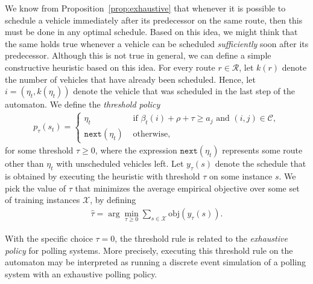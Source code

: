 \documentclass[a4paper]{article}
\theoremstyle{definition}
\theoremstyle{plain}
\begin{document}
We know from Proposition~\ref{prop:exhaustive} that whenever it is possible to schedule a vehicle
immediately after its predecessor on the same route, then this must be done in
any optimal schedule.
%
Based on this idea, we might think that the same holds true whenever a vehicle
can be scheduled \textit{sufficiently} soon after its predecessor. Although this
is not true in general, we can define a simple constructive heuristic based on
this idea.
%
For every route $r \in \mathcal{R}$, let $k(r)$ denote the number of vehicles
that have already been scheduled. Hence, let $i = (\eta_{t}, k(\eta_{t}))$
denote the vehicle that was scheduled in the last step of the automaton. We
define the \textit{threshold policy}
\begin{align*}
  p_{\tau}(s_{t}) = \begin{cases}
                \eta_{t} \quad &\text{ if } \beta_{t}(i) + \rho + \tau \geq a_{j} \text{ and } (i,j) \in \mathcal{C} , \\
                \texttt{next}(\eta_{t}) & \text{ otherwise, }
              \end{cases}
\end{align*}
for some threshold $\tau \geq 0$, where the expression $\texttt{next}(\eta_{t})$ represents some route
other than $\eta_{t}$ with unscheduled vehicles left.
%
Let $y_{\tau}(s)$ denote the schedule that is obtained by executing the
heuristic with threshold $\tau$ on some instance $s$. We pick the value of $\tau$
that minimizes the average empirical objective over some set of training
instances $\mathcal{X}$, by defining
%
\begin{align*}
  \hat{\tau} = \arg\min_{\tau \geq 0} \sum_{s \in \mathcal{X}} \textrm{obj}(y_{\tau}(s)) .
\end{align*}

With the specific choice $\tau = 0$, the threshold rule is related to the \textit{exhaustive policy}
for polling systems. More precisely, executing this threshold rule on the
automaton may be interpreted as running a discrete event simulation of a polling
system with an exhaustive polling policy.
\end{document}
